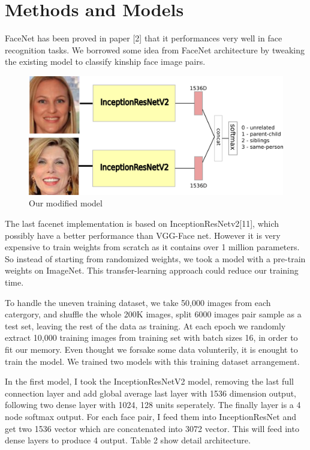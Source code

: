 \documentclass{article}
\begin{document}
\section{Methods and Models}

FaceNet has been proved in paper [2] that it performances very well in face
recognition tasks. We borrowed some idea from FaceNet architecture by tweaking
the existing model to classify kinship face image pairs.

\begin{figure}[h]
	\caption{Our modified model}
	\includegraphics[width=1\textwidth]{img/model_pic1}
	\centering
\end{figure}

The last facenet implementation is based on InceptionResNetv2[11], which
possibly have a better performance than VGG-Face net. However it is very
expensive to train weights from scratch as it contains over 1 million
parameters. So instead of starting from randomized weights, we took a model
with a pre-train weights on ImageNet. This transfer-learning approach could
reduce our training time.

To handle the uneven training dataset, we take 50,000 images from each
catergory, and shuffle the whole 200K images, split 6000 images pair sample as
a test set, leaving the rest of the data as training. At each epoch we randomly
extract 10,000 training images from training set with batch sizes 16, in order
to fit our memory.  Even thought we forsake some data volunterily, it is
enought to train the model. We trained two models with this training dataset
arrangement.

In the first model, I took the InceptionResNetV2 model, removing the last full
connection layer and add global average last layer with 1536 dimension output,
following two dense layer with 1024, 128 units seperately. The finally layer is
a 4 node softmax output. For each face pair, I feed them into InceptionResNet
and get two 1536 vector which are concatenated into 3072 vector. This will feed
into dense layers to produce 4 output. Table 2 show detail architecture.
\end{document}
